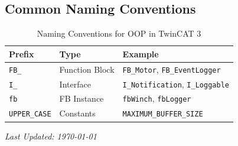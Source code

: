 \documentclass[11pt,a4paper]{article}
\begin{document}
\subsection*{Common Naming Conventions}

\begin{table}[h]
\centering
\begin{tabular}{@{}lll@{}}
\toprule
\textbf{Prefix} & \textbf{Type} & \textbf{Example} \\
\midrule
\texttt{FB\_} & Function Block & \texttt{FB\_Motor}, \texttt{FB\_EventLogger} \\
\texttt{I\_} & Interface & \texttt{I\_Notification}, \texttt{I\_Loggable} \\
\texttt{fb} & FB Instance & \texttt{fbWinch}, \texttt{fbLogger} \\
\texttt{UPPER\_CASE} & Constants & \texttt{MAXIMUM\_BUFFER\_SIZE} \\
\bottomrule
\end{tabular}
\caption{Naming Conventions for OOP in TwinCAT 3}
\end{table}

\vfill

\begin{center}
\textit{Last Updated: \today}
\end{center}
\end{document}
